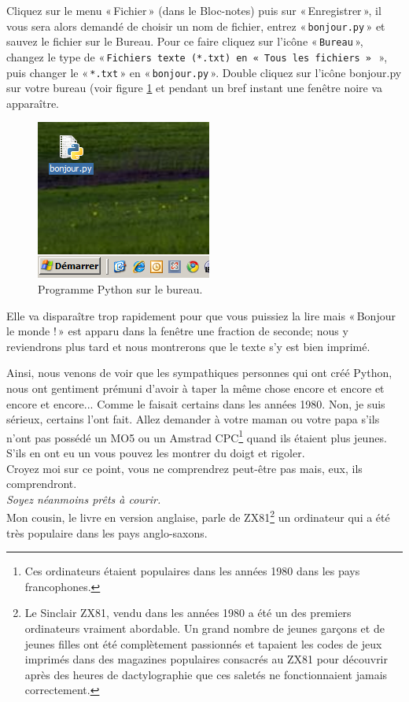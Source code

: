 Cliquez sur le menu « Fichier » (dans le Bloc-notes) puis sur « Enregistrer », il vous sera alors demandé de choisir un nom de fichier, entrez « \texttt{bonjour.py} » et sauvez le fichier sur le Bureau. Pour ce faire cliquez sur l'icône « \texttt{Bureau} », changez le type de « \texttt{Fichiers texte (*.txt) en « \texttt{Tous les fichiers} » } », puis changer le « \texttt{*.txt} » en « \texttt{bonjour.py} ». Double cliquez sur l'icône bonjour.py sur votre bureau (voir figure \ref{fig:bureau} et pendant un bref instant une fenêtre noire va apparaître.

\begin{figure}[!ht]
\centering
\includegraphics[scale=0.6]{images/bureau}
\caption{Programme Python sur le bureau.}\label{fig:bureau}
\end{figure}

Elle va disparaître trop rapidement pour que vous puissiez la lire mais « Bonjour le monde ! » est apparu dans la fenêtre une fraction de seconde; nous y reviendrons plus tard et nous montrerons que le texte s'y est bien imprimé.

Ainsi, nous venons de voir que les sympathiques personnes qui ont créé Python, nous ont gentiment prémuni d'avoir à taper la même chose encore et encore et encore et encore... Comme le faisait certains dans les années 1980. Non, je suis sérieux, certains l'ont fait. Allez demander à votre maman ou votre papa s'ils n'ont pas possédé un MO5 ou un Amstrad CPC\footnote{Ces ordinateurs étaient populaires dans les années 1980 dans les pays francophones.} quand ils étaient plus jeunes. S'ils en ont eu un vous pouvez les montrer du doigt et rigoler.\\


Croyez moi sur ce point, vous ne comprendrez peut-être pas mais, eux, ils comprendront.\\

\emph{Soyez néanmoins prêts à courir.}\\


Mon cousin, le livre en version anglaise, parle de ZX81\footnote{Le Sinclair ZX81, vendu dans les années 1980 a été un des premiers ordinateurs vraiment abordable. Un grand nombre de jeunes garçons et de jeunes filles ont été complètement passionnés et tapaient les codes de jeux imprimés dans des magazines populaires consacrés au ZX81 pour découvrir après des heures de dactylographie que ces saletés ne fonctionnaient jamais correctement.} un ordinateur qui a été très populaire dans les pays anglo-saxons.


